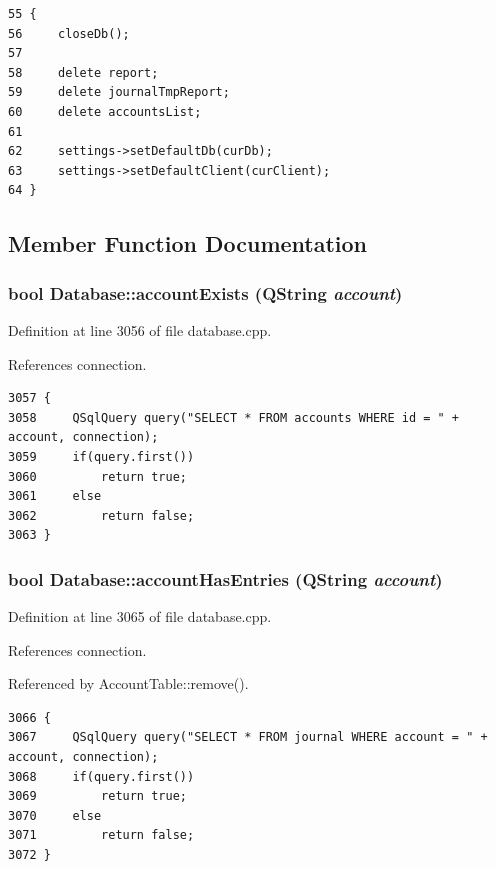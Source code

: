 \footnotesize\begin{verbatim}55 {
56     closeDb();
57 
58     delete report;
59     delete journalTmpReport;
60     delete accountsList;
61 
62     settings->setDefaultDb(curDb);
63     settings->setDefaultClient(curClient);
64 }
\end{verbatim}\normalsize 




\subsection{Member Function Documentation}
\hypertarget{classDatabase_a55}{
\subsubsection[accountExists]{\setlength{\rightskip}{0pt plus 5cm}bool Database::account\-Exists (QString {\em account})}}
\label{classDatabase_a55}


Definition at line 3056 of file database.cpp.

References connection.

\footnotesize\begin{verbatim}3057 {
3058     QSqlQuery query("SELECT * FROM accounts WHERE id = " + account, connection);
3059     if(query.first())
3060         return true;
3061     else
3062         return false;
3063 }
\end{verbatim}\normalsize 


\hypertarget{classDatabase_a56}{
\subsubsection[accountHasEntries]{\setlength{\rightskip}{0pt plus 5cm}bool Database::account\-Has\-Entries (QString {\em account})}}
\label{classDatabase_a56}


Definition at line 3065 of file database.cpp.

References connection.

Referenced by Account\-Table::remove().

\footnotesize\begin{verbatim}3066 {
3067     QSqlQuery query("SELECT * FROM journal WHERE account = " + account, connection);
3068     if(query.first())
3069         return true;
3070     else
3071         return false;
3072 }
\end{verbatim}\normalsize 


